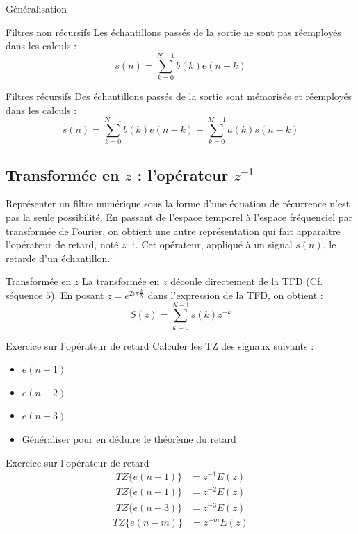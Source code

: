 \documentclass{beamer}
\begin{document}
\begin{frame}{Généralisation}
\begin{block}{Filtres non récursifs}
\justify Les échantillons passés de la sortie ne sont pas réemployés dans les
calculs :
$$
s(n)=\sum_{k=0}^{N-1}b(k)e(n-k)
$$
\end{block}
\pause
\begin{block}{Filtres récursifs}
\justify Des échantillons passés de la sortie sont mémorisés et réemployés dans
les calculs :
$$
s(n)=\sum_{k=0}^{N-1}b(k)e(n-k) - \sum_{k=0}^{M-1}a(k)s(n-k)
$$ 
\end{block}
\end{frame}

\subsection{Transformée en $z$ : l'opérateur $z^{-1}$}

\begin{frame}
\justify Représenter un filtre numérique sous la forme d'une équation de
récurrence n'est pas la seule possibilité. En passant de l'espace temporel à
l'espace fréquenciel par transformée de Fourier, on obtient une autre
représentation qui fait apparaître l'opérateur de retard, noté $z^{-1}$. Cet
opérateur, appliqué à un signal $s(n)$, le retarde d'un échantillon.
\pause
\begin{block}{Transformée en $z$}
\justify La transformée en $z$ découle directement de la TFD (Cf. séquence $5$).
En posant $z=e^{2i\pi\frac{k}{N}}$ dans l'expression de la TFD, on obtient :
$$
S(z) = \sum_{k=0}^{N-1}s(k)z^{-k}
$$
\end{block}
\end{frame}

\begin{frame}
\begin{exampleblock}{Exercice sur l'opérateur de retard}
	\justifying
	Calculer les TZ des signaux suivants :
\begin{itemize}
	\item $e(n-1)$
	\item $e(n-2)$
	\item $e(n-3)$
	\item Généraliser pour en déduire le théorème du retard
\end{itemize}	
\end{exampleblock}
\end{frame}

\begin{frame}
\begin{exampleblock}{Exercice sur l'opérateur de retard}
\begin{align*}
TZ\{e(n-1)\} &= z^{-1}E(z)
\end{align*}
\pause
\begin{align*}
TZ\{ e(n-1)\} &= z^{-2}E(z)\\
TZ\{ e(n-3)\} &= z^{-3}E(z)
\end{align*}
\pause
\begin{align*}
TZ\{ e(n-m)\} &= z^{-m}E(z)
\end{align*}
\end{exampleblock}
\end{frame}
\end{document}
